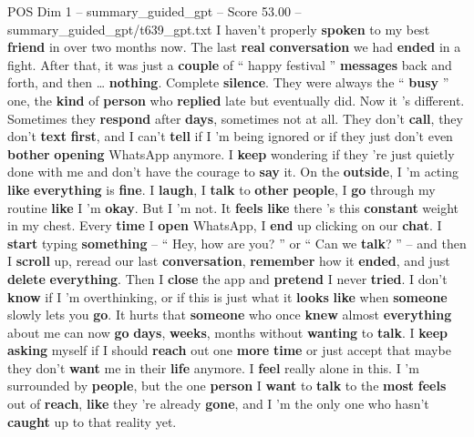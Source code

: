 \begin{textsample}{POS Dim 1 – summary\_guided\_gpt – Score 53.00 – summary\_guided\_gpt/t639\_gpt.txt}  \label{ex:f1_pos_026}
I haven't properly \textbf{spoken} to my best \textbf{friend} in over two months now.
The last \textbf{real} \textbf{conversation} we had \textbf{ended} in a fight.
After that, it was just a \textbf{couple} of “ happy festival ” \textbf{messages} back and forth, and then … \textbf{nothing}.
Complete \textbf{silence}.
They were always the “ \textbf{busy} ” one, the \textbf{kind} of \textbf{person} who \textbf{replied} late but eventually did.
Now it ’s different.
Sometimes they \textbf{respond} after \textbf{days}, sometimes not at all.
They don't \textbf{call}, they don't \textbf{text} \textbf{first}, and I can't \textbf{tell} if I ’m being ignored or if they just don't even \textbf{bother} \textbf{opening} WhatsApp anymore.
I \textbf{keep} wondering if they ’re just quietly done with me and don't have the courage to \textbf{say} it.
On the \textbf{outside}, I ’m acting \textbf{like} \textbf{everything} is \textbf{fine}.
I \textbf{laugh}, I \textbf{talk} to \textbf{other} \textbf{people}, I \textbf{go} through my routine \textbf{like} I ’m \textbf{okay}.
But I ’m not.
It \textbf{feels} \textbf{like} there ’s this \textbf{constant} weight in my chest.
Every \textbf{time} I \textbf{open} WhatsApp, I \textbf{end} up clicking on our \textbf{chat}.
I \textbf{start} typing \textbf{something} – “ Hey, how are you? ” or “ Can we \textbf{talk}? ” – and then I \textbf{scroll} up, reread our last \textbf{conversation}, \textbf{remember} how it \textbf{ended}, and just \textbf{delete} \textbf{everything}.
Then I \textbf{close} the app and \textbf{pretend} I never \textbf{tried}.
I don't \textbf{know} if I ’m overthinking, or if this is just what it \textbf{looks} \textbf{like} when \textbf{someone} slowly lets you \textbf{go}.
It hurts that \textbf{someone} who once \textbf{knew} almost \textbf{everything} about me can now \textbf{go} \textbf{days}, \textbf{weeks}, months without \textbf{wanting} to \textbf{talk}.
I \textbf{keep} \textbf{asking} myself if I should \textbf{reach} out one \textbf{more} \textbf{time} or just accept that maybe they don't \textbf{want} me in their \textbf{life} anymore.
I \textbf{feel} really alone in this.
I ’m surrounded by \textbf{people}, but the one \textbf{person} I \textbf{want} to \textbf{talk} to the \textbf{most} \textbf{feels} out of \textbf{reach}, \textbf{like} they ’re already \textbf{gone}, and I ’m the only one who hasn't \textbf{caught} up to that reality yet.

\end{textsample}

